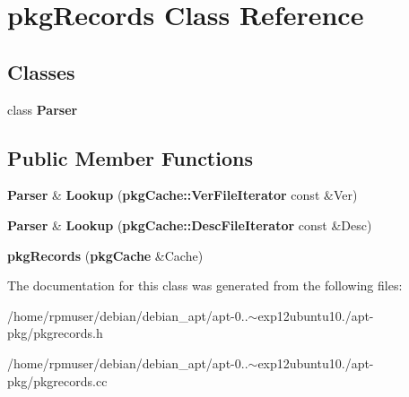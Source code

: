 \section{pkg\-Records \-Class \-Reference}
\label{classpkgRecords}
\subsection*{\-Classes}
\begin{DoxyCompactItemize}
\item 
class {\bf \-Parser}
\end{DoxyCompactItemize}
\subsection*{\-Public \-Member \-Functions}
\begin{DoxyCompactItemize}
\item 
{\bf \-Parser} \& {\bfseries \-Lookup} ({\bf pkg\-Cache\-::\-Ver\-File\-Iterator} const \&\-Ver)\label{classpkgRecords_a820856aa03728bcfe37685766500f5d0}

\item 
{\bf \-Parser} \& {\bfseries \-Lookup} ({\bf pkg\-Cache\-::\-Desc\-File\-Iterator} const \&\-Desc)\label{classpkgRecords_a388488db3d3915992216c488cc17319a}

\item 
{\bfseries pkg\-Records} ({\bf pkg\-Cache} \&\-Cache)\label{classpkgRecords_aba528f04b04ea0170cfd07a8f6f9dfdd}

\end{DoxyCompactItemize}


\-The documentation for this class was generated from the following files\-:\begin{DoxyCompactItemize}
\item 
/home/rpmuser/debian/debian\-\_\-apt/apt-\/0..$\sim$exp12ubuntu10./apt-\/pkg/pkgrecords.\-h\item 
/home/rpmuser/debian/debian\-\_\-apt/apt-\/0..$\sim$exp12ubuntu10./apt-\/pkg/pkgrecords.\-cc\end{DoxyCompactItemize}
